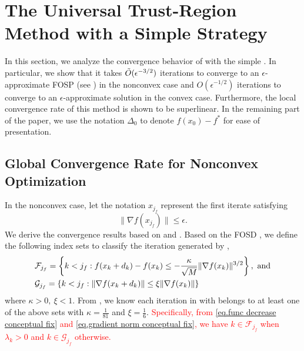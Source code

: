 \section{The Universal Trust-Region Method with a Simple Strategy}\label{sec.globalconv}
In this section, we analyze the convergence behavior of  with the simple . In particular, we show that it takes $\Tilde{O}(\epsilon^{-3/2})$ iterations to converge to an $\epsilon$-approximate FOSP (see ) in the nonconvex case and $O(\epsilon^{-1/2})$ iterations to converge to an $\epsilon$-approximate solution in the convex case. Furthermore, the local convergence rate of this method is shown to be superlinear. In the remaining part of the paper, we use the notation $\Delta_0$ to denote $f(x_0)-f^*$ for ease of presentation.

\subsection{Global Convergence Rate for Nonconvex Optimization}
In the nonconvex case,
let the notation $x_{j_f}$ represent the first iterate satisfying
\begin{equation*}
    \|\nabla f(x_{j_f})\|\leq \epsilon.
\end{equation*}
We derive the convergence results based on  and .
Based on the FOSD , we define the following index sets to classify the iteration generated by ,
\begin{equation}\label{eq.index set}
    \begin{aligned}
         & \mathcal{F}_{j_f} = \left\{k < j_f: f(\xk+\dk)-f(\xk)\leq -\frac{\kappa}{\sqrt{M}}\|\gk\|^{3/2}\right\}, \ \text{and} \\
         & \mathcal{G}_{j_f} = \left\{k < j_f: \|\nabla f(\xk+\dk)\|\leq \xi\|\gk\|\right\}
    \end{aligned}
\end{equation}
where $\kappa > 0,~\xi < 1$.
From , we know each iteration in  with  belongs to at least one of the above sets with $\kappa = \frac{1}{81}$ and $\xi=\frac{1}{6}$. \textcolor{red}{Specifically, from \eqref{eq.func decrease conceptual fix} and \eqref{eq.gradient norm conceptual fix}, we have $k\in\mathcal{F}_{j_f}$ when $\lambda_k>0$ and $k\in \mathcal{G}_{j_f}$ otherwise.}

